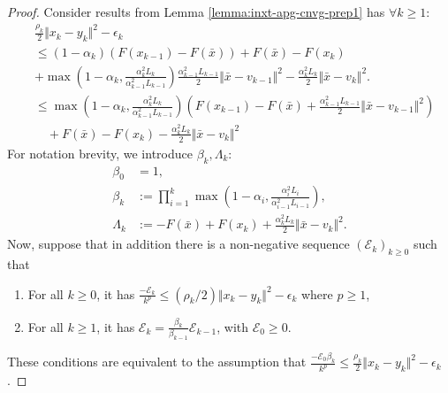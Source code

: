 \documentclass[12pt]{article}
\begin{document}
    \begin{proof}
        Consider results from Lemma \ref{lemma:inxt-apg-cnvg-prep1} has $\forall k \ge 1$: 
        \begin{align*}
            & \frac{\rho_k}{2}\Vert x_k - y_k\Vert^2 - \epsilon_k
            \\
            &\le 
            (1 - \alpha_k)(F(x_{k - 1}) - F(\bar x)) + F(\bar x) - F(x_k) 
            \\ &
            + \max\left(
                    1 - \alpha_k, \frac{\alpha_k^2L_k}{\alpha_{k - 1}^2L_{k - 1}}
                \right)\frac{\alpha_{k - 1}^2L_{k - 1}}{2}\Vert \bar x - v_{k - 1}\Vert^2 
            - \frac{\alpha_k^2L_k}{2}\Vert \bar x - v_k\Vert^2. 
            \\
            &\le \max\left(
                1 - \alpha_k, \frac{\alpha_k^2L_k}{\alpha_{k - 1}^2L_{k - 1}}
            \right)\left(
                F(x_{k - 1}) - F(\bar x)
                + \frac{\alpha_{k - 1}^2L_{k - 1}}{2}\Vert \bar x - v_{k - 1}\Vert^2 
            \right)
            \\&\quad 
                + F(\bar x) - F(x_k) - \frac{\alpha_k^2L_k}{2}\Vert \bar x - v_k\Vert^2
        \end{align*}
        For notation brevity, we introduce $\beta_k, \Lambda_k$: 
        \begin{align*}
            \beta_0 &= 1, 
            \\
            \beta_k &:= \prod_{i = 1}^{k} \max\left(
                1 - \alpha_i, \frac{\alpha_i^2L_i}{\alpha_{i - 1}^2L_{i - 1}}
            \right),
            \\
            \Lambda_k &:= 
            - F(\bar x) + F(x_k) + \frac{\alpha_k^2L_k}{2}\Vert \bar x - v_k\Vert^2. 
        \end{align*}
        Now, suppose that in addition there is a non-negative sequence $(\mathcal  E_k)_{k \ge 0}$ such that 
        \begin{enumerate}[nosep]
            \item For all $k \ge 0$, it has $\frac{-\mathcal E_k}{k^p} \le (\rho_k/2)\Vert x_k - y_k\Vert^2 - \epsilon_k$ where $p \ge 1$, 
            \item For all $k \ge 1$, it has $\mathcal E_k = \frac{\beta_k}{\beta_{k - 1}}\mathcal E_{k - 1}$, with $\mathcal E_0 \ge 0$. 
        \end{enumerate}
        These conditions are equivalent to the assumption that $\frac{- \mathcal E_0\beta_k}{k^p} \le \frac{\rho_k}{2}\Vert x_k - y_k\Vert^2 - \epsilon_k$. 

\end{proof}
\end{document}

